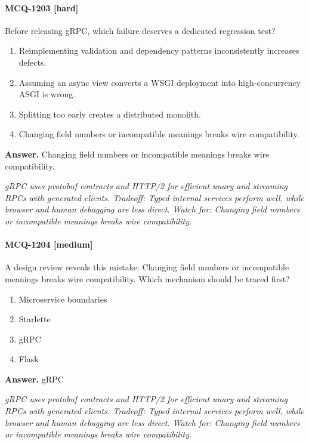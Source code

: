 \paragraph{MCQ-1203 [hard]} Before releasing gRPC, which failure deserves a dedicated regression test?
\begin{enumerate}[label=\Alph*.]
\item Reimplementing validation and dependency patterns inconsistently increases defects.
\item Assuming an async view converts a WSGI deployment into high-concurrency ASGI is wrong.
\item Splitting too early creates a distributed monolith.
\item Changing field numbers or incompatible meanings breaks wire compatibility.
\end{enumerate}
\noindent\textbf{Answer.} Changing field numbers or incompatible meanings breaks wire compatibility.
\par\textit{gRPC uses protobuf contracts and HTTP/2 for efficient unary and streaming RPCs with generated clients. Tradeoff: Typed internal services perform well, while browser and human debugging are less direct. Watch for: Changing field numbers or incompatible meanings breaks wire compatibility.}
\paragraph{MCQ-1204 [medium]} A design review reveals this mistake: Changing field numbers or incompatible meanings breaks wire compatibility. Which mechanism should be traced first?
\begin{enumerate}[label=\Alph*.]
\item Microservice boundaries
\item Starlette
\item gRPC
\item Flask
\end{enumerate}
\noindent\textbf{Answer.} gRPC
\par\textit{gRPC uses protobuf contracts and HTTP/2 for efficient unary and streaming RPCs with generated clients. Tradeoff: Typed internal services perform well, while browser and human debugging are less direct. Watch for: Changing field numbers or incompatible meanings breaks wire compatibility.}
